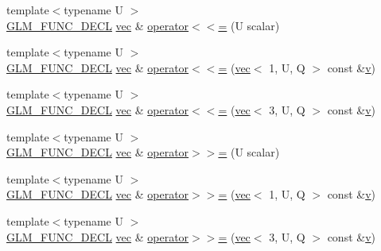 \begin{DoxyCompactItemize}
\item 
{\footnotesize template$<$typename U $>$ }\\\mbox{\hyperlink{setup_8hpp_ab2d052de21a70539923e9bcbf6e83a51}{G\+L\+M\+\_\+\+F\+U\+N\+C\+\_\+\+D\+E\+CL}} \mbox{\hyperlink{structglm_1_1vec}{vec}} \& \mbox{\hyperlink{structglm_1_1vec_3_013_00_01_t_00_01_q_01_4_ab07f795306e494f77fd34b9540161461}{operator$<$$<$=}} (U scalar)
\item 
{\footnotesize template$<$typename U $>$ }\\\mbox{\hyperlink{setup_8hpp_ab2d052de21a70539923e9bcbf6e83a51}{G\+L\+M\+\_\+\+F\+U\+N\+C\+\_\+\+D\+E\+CL}} \mbox{\hyperlink{structglm_1_1vec}{vec}} \& \mbox{\hyperlink{structglm_1_1vec_3_013_00_01_t_00_01_q_01_4_a1325fb6cc79d8e3676e9b2be79c20df3}{operator$<$$<$=}} (\mbox{\hyperlink{structglm_1_1vec}{vec}}$<$ 1, U, Q $>$ const \&\mbox{\hyperlink{_s_d_l__opengl_8h_a10a82eabcb59d2fcd74acee063775f90}{v}})
\item 
{\footnotesize template$<$typename U $>$ }\\\mbox{\hyperlink{setup_8hpp_ab2d052de21a70539923e9bcbf6e83a51}{G\+L\+M\+\_\+\+F\+U\+N\+C\+\_\+\+D\+E\+CL}} \mbox{\hyperlink{structglm_1_1vec}{vec}} \& \mbox{\hyperlink{structglm_1_1vec_3_013_00_01_t_00_01_q_01_4_aad0c7ea72dfec6224b1a5cabeea950fb}{operator$<$$<$=}} (\mbox{\hyperlink{structglm_1_1vec}{vec}}$<$ 3, U, Q $>$ const \&\mbox{\hyperlink{_s_d_l__opengl_8h_a10a82eabcb59d2fcd74acee063775f90}{v}})
\item 
{\footnotesize template$<$typename U $>$ }\\\mbox{\hyperlink{setup_8hpp_ab2d052de21a70539923e9bcbf6e83a51}{G\+L\+M\+\_\+\+F\+U\+N\+C\+\_\+\+D\+E\+CL}} \mbox{\hyperlink{structglm_1_1vec}{vec}} \& \mbox{\hyperlink{structglm_1_1vec_3_013_00_01_t_00_01_q_01_4_af6fe1a33a28847e310e829a9543143f7}{operator$>$$>$=}} (U scalar)
\item 
{\footnotesize template$<$typename U $>$ }\\\mbox{\hyperlink{setup_8hpp_ab2d052de21a70539923e9bcbf6e83a51}{G\+L\+M\+\_\+\+F\+U\+N\+C\+\_\+\+D\+E\+CL}} \mbox{\hyperlink{structglm_1_1vec}{vec}} \& \mbox{\hyperlink{structglm_1_1vec_3_013_00_01_t_00_01_q_01_4_a6b9d6604ed427e6098aa136ea98be7dd}{operator$>$$>$=}} (\mbox{\hyperlink{structglm_1_1vec}{vec}}$<$ 1, U, Q $>$ const \&\mbox{\hyperlink{_s_d_l__opengl_8h_a10a82eabcb59d2fcd74acee063775f90}{v}})
\item 
{\footnotesize template$<$typename U $>$ }\\\mbox{\hyperlink{setup_8hpp_ab2d052de21a70539923e9bcbf6e83a51}{G\+L\+M\+\_\+\+F\+U\+N\+C\+\_\+\+D\+E\+CL}} \mbox{\hyperlink{structglm_1_1vec}{vec}} \& \mbox{\hyperlink{structglm_1_1vec_3_013_00_01_t_00_01_q_01_4_a2f52f05d54329e0dddf515de1f2b32be}{operator$>$$>$=}} (\mbox{\hyperlink{structglm_1_1vec}{vec}}$<$ 3, U, Q $>$ const \&\mbox{\hyperlink{_s_d_l__opengl_8h_a10a82eabcb59d2fcd74acee063775f90}{v}})

\end{DoxyCompactItemize}
